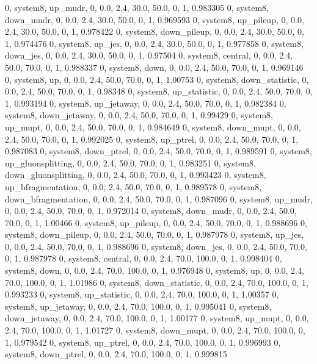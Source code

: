 0, system8, up_mudr,         0, 0.0, 2.4, 30.0, 50.0, 0, 1, 0.983305
0, system8, down_mudr,       0, 0.0, 2.4, 30.0, 50.0, 0, 1, 0.969593
0, system8, up_pileup,       0, 0.0, 2.4, 30.0, 50.0, 0, 1, 0.978422
0, system8, down_pileup,     0, 0.0, 2.4, 30.0, 50.0, 0, 1, 0.974476
0, system8, up_jes,          0, 0.0, 2.4, 30.0, 50.0, 0, 1, 0.977858
0, system8, down_jes,        0, 0.0, 2.4, 30.0, 50.0, 0, 1, 0.97504
0, system8, central,    0, 0.0, 2.4, 50.0, 70.0, 0, 1, 0.988337
0, system8, down,       0, 0.0, 2.4, 50.0, 70.0, 0, 1, 0.969146
0, system8, up,         0, 0.0, 2.4, 50.0, 70.0, 0, 1, 1.00753
0, system8, down_statistic,       0, 0.0, 2.4, 50.0, 70.0, 0, 1, 0.98348
0, system8, up_statistic,         0, 0.0, 2.4, 50.0, 70.0, 0, 1, 0.993194
0, system8, up_jetaway,      0, 0.0, 2.4, 50.0, 70.0, 0, 1, 0.982384
0, system8, down_jetaway,    0, 0.0, 2.4, 50.0, 70.0, 0, 1, 0.99429
0, system8, up_mupt,         0, 0.0, 2.4, 50.0, 70.0, 0, 1, 0.984649
0, system8, down_mupt,       0, 0.0, 2.4, 50.0, 70.0, 0, 1, 0.992025
0, system8, up_ptrel,        0, 0.0, 2.4, 50.0, 70.0, 0, 1, 0.987083
0, system8, down_ptrel,      0, 0.0, 2.4, 50.0, 70.0, 0, 1, 0.989591
0, system8, up_gluonsplitting, 0, 0.0, 2.4, 50.0, 70.0, 0, 1, 0.983251
0, system8, down_gluonsplitting, 0, 0.0, 2.4, 50.0, 70.0, 0, 1, 0.993423
0, system8, up_bfragmentation, 0, 0.0, 2.4, 50.0, 70.0, 0, 1, 0.989578
0, system8, down_bfragmentation, 0, 0.0, 2.4, 50.0, 70.0, 0, 1, 0.987096
0, system8, up_mudr,         0, 0.0, 2.4, 50.0, 70.0, 0, 1, 0.972014
0, system8, down_mudr,       0, 0.0, 2.4, 50.0, 70.0, 0, 1, 1.00466
0, system8, up_pileup,       0, 0.0, 2.4, 50.0, 70.0, 0, 1, 0.988696
0, system8, down_pileup,     0, 0.0, 2.4, 50.0, 70.0, 0, 1, 0.987978
0, system8, up_jes,          0, 0.0, 2.4, 50.0, 70.0, 0, 1, 0.988696
0, system8, down_jes,        0, 0.0, 2.4, 50.0, 70.0, 0, 1, 0.987978
0, system8, central,    0, 0.0, 2.4, 70.0, 100.0, 0, 1, 0.998404
0, system8, down,       0, 0.0, 2.4, 70.0, 100.0, 0, 1, 0.976948
0, system8, up,         0, 0.0, 2.4, 70.0, 100.0, 0, 1, 1.01986
0, system8, down_statistic,       0, 0.0, 2.4, 70.0, 100.0, 0, 1, 0.993233
0, system8, up_statistic,         0, 0.0, 2.4, 70.0, 100.0, 0, 1, 1.00357
0, system8, up_jetaway,      0, 0.0, 2.4, 70.0, 100.0, 0, 1, 0.995041
0, system8, down_jetaway,    0, 0.0, 2.4, 70.0, 100.0, 0, 1, 1.00177
0, system8, up_mupt,         0, 0.0, 2.4, 70.0, 100.0, 0, 1, 1.01727
0, system8, down_mupt,       0, 0.0, 2.4, 70.0, 100.0, 0, 1, 0.979542
0, system8, up_ptrel,        0, 0.0, 2.4, 70.0, 100.0, 0, 1, 0.996993
0, system8, down_ptrel,      0, 0.0, 2.4, 70.0, 100.0, 0, 1, 0.999815
